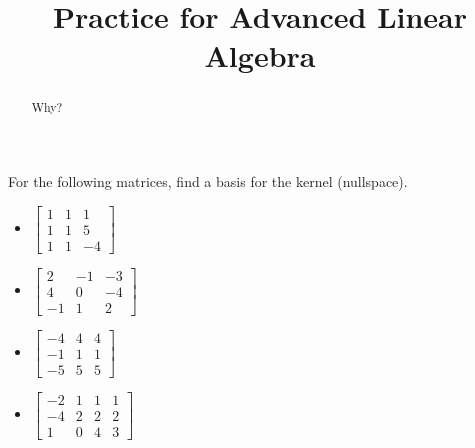 \documentclass{ximera}
\title{Practice for Advanced Linear Algebra}
\begin{document}
\begin{abstract}
Why?
\end{abstract}
\maketitle

\begin{exercise}
    For the following matrices, find a basis for the kernel (nullspace).
    \begin{itemize}
        \item
        $\begin{bmatrix}
            1 & 1 & 1 \\
            1 & 1 & 5 \\
            1 & 1 & -4
        \end{bmatrix}$
        \item
        $\begin{bmatrix}
            2 & -1 & -3 \\
            4 & 0 & -4 \\
            -1 & 1 & 2
        \end{bmatrix}$
        \item
        $\begin{bmatrix}
            -4 & 4 & 4 \\
            -1 & 1 & 1 \\
            -5 & 5 & 5
        \end{bmatrix}$
        \item
        $\begin{bmatrix}
            -2 & 1 & 1 & 1 \\
            -4 & 2 & 2 & 2 \\
            1 & 0 & 4 & 3
        \end{bmatrix}$
    \end{itemize}
\end{exercise}
\end{document}
